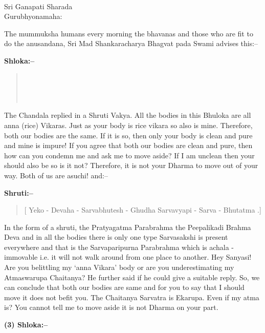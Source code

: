 \begin{center}
\\ Sri Ganapati Sharada\\ Gurubhyonamaha:
\end{center}

The mummuksha humans every morning the bhavanas and those who are fit to do the anusandana, Sri Mad Shankaracharya Bhagvat pada Swami advises this:–

\textbf{Shloka:–}

\begin{verse}
 \\\\\\
\end{verse}

The Chandala replied in a Shruti Vakya. All the bodies in this Bhuloka are all anna (rice) Vikaras. Just as your body is rice vikara so also is mine. Therefore, both our bodies are the same. If it is so, then only your body is clean and pure and mine is impure! If you agree that both our bodies are clean and pure, then how can you condemn me and ask me to move aside? If I am unclean then your should also be so is it not? Therefore, it is not your Dharma to move out of your way. Both of us are asuchi! and:–

\newpage

\textbf{Shruti:–}

\begin{verse}
[ Yeko - Devaha - Sarvabhutesh - Ghudha  Sarvavyapi - Sarva - Bhutatma .]
\end{verse}

In the form of a shruti, the Pratyagatma Parabrahma the Peepalikadi Brahma Deva and in all the bodies there is only one type Sarvasakshi is present everywhere and that is the Sarvaparipurna Parabrahma which is achala - immovable i.e. it will not walk around from one place to another. Hey Sanyasi! Are you belittling my ‘anna Vikara’ body or are you underestimating my Atmaswarupa Chaitanya? He further said if he could give a suitable reply. So, we can conclude that both our bodies are same and for you to say that I should move it does not befit you. The Chaitanya Sarvatra is Ekarupa. Even if my atma is? You cannot tell me to move aside it is not Dharma on your part.

\textbf{(3) Shloka:–}

